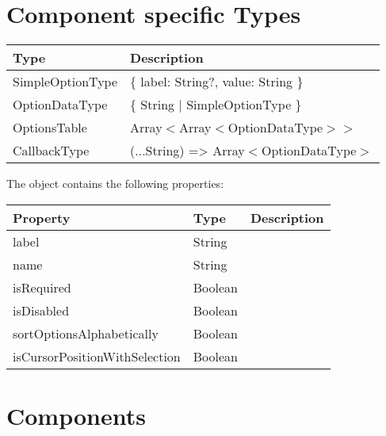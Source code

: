 \section*{Component specific Types}

\begin{table}[!htb] 
    \label{api:selectComponentTypes}
    \footnotesize
    \setlength\extrarowheight{4pt}
    \begin{tabular}{ p{5cm} p{8cm}}
        \toprule[1.2pt]
        \textbf{Type}    & \textbf{Description} \\
        \midrule    
        SimpleOptionType & \{ label: String?, value: String \}    \\
        OptionDataType   & \{ String | SimpleOptionType \}        \\
        OptionsTable     & Array$<$Array$<$OptionDataType$>>$       \\
        CallbackType     & (...String) => Array$<$OptionDataType$>$ \\
        \bottomrule[1.2pt]
    \end{tabular}
\end{table}

\vspace*{12pt}
The  object contains the following properties: 

\begin{table}[!htb] 
    \label{api:selectComponentSelectAttributes}
    \footnotesize
    \setlength\extrarowheight{4pt}
    \begin{tabular}{ p{4cm} p{3cm} p{6cm} }
        \toprule[1.2pt]
        \textbf{Property}             & \textbf{Type} & \textbf{Description} \\
        \midrule
        label                         & String        &  \\
        name                          & String        &  \\
        isRequired                    & Boolean       &  \\
        isDisabled                    & Boolean       &  \\
        sortOptionsAlphabetically     & Boolean       &  \\
        isCursorPositionWithSelection & Boolean       &  \\
        \bottomrule[1.2pt]
    \end{tabular}
\end{table}


\clearpage
\section*{Components}

